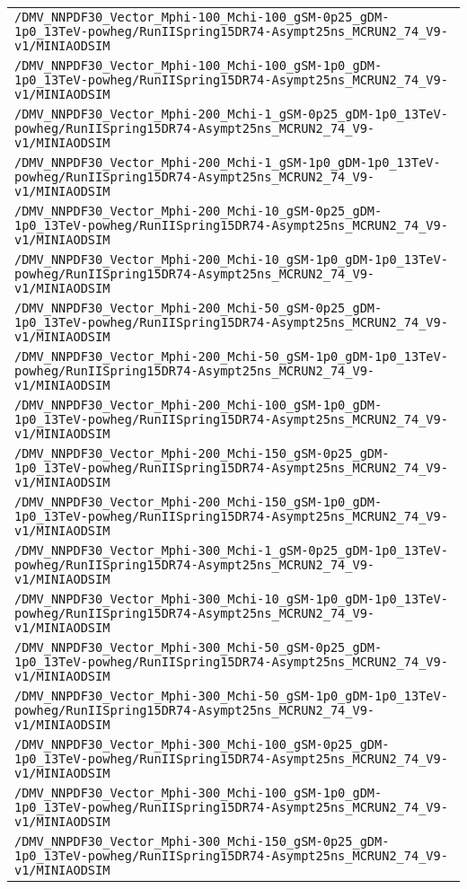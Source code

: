 \begin{center}
\begin{tabular}{l}
\verb!/DMV_NNPDF30_Vector_Mphi-100_Mchi-100_gSM-0p25_gDM-1p0_13TeV-powheg/RunIISpring15DR74-Asympt25ns_MCRUN2_74_V9-v1/MINIAODSIM! \tabularnewline
\verb!/DMV_NNPDF30_Vector_Mphi-100_Mchi-100_gSM-1p0_gDM-1p0_13TeV-powheg/RunIISpring15DR74-Asympt25ns_MCRUN2_74_V9-v1/MINIAODSIM! \tabularnewline
\verb!/DMV_NNPDF30_Vector_Mphi-200_Mchi-1_gSM-0p25_gDM-1p0_13TeV-powheg/RunIISpring15DR74-Asympt25ns_MCRUN2_74_V9-v1/MINIAODSIM! \tabularnewline
\verb!/DMV_NNPDF30_Vector_Mphi-200_Mchi-1_gSM-1p0_gDM-1p0_13TeV-powheg/RunIISpring15DR74-Asympt25ns_MCRUN2_74_V9-v1/MINIAODSIM! \tabularnewline
\verb!/DMV_NNPDF30_Vector_Mphi-200_Mchi-10_gSM-0p25_gDM-1p0_13TeV-powheg/RunIISpring15DR74-Asympt25ns_MCRUN2_74_V9-v1/MINIAODSIM! \tabularnewline
\verb!/DMV_NNPDF30_Vector_Mphi-200_Mchi-10_gSM-1p0_gDM-1p0_13TeV-powheg/RunIISpring15DR74-Asympt25ns_MCRUN2_74_V9-v1/MINIAODSIM! \tabularnewline
\verb!/DMV_NNPDF30_Vector_Mphi-200_Mchi-50_gSM-0p25_gDM-1p0_13TeV-powheg/RunIISpring15DR74-Asympt25ns_MCRUN2_74_V9-v1/MINIAODSIM! \tabularnewline
\verb!/DMV_NNPDF30_Vector_Mphi-200_Mchi-50_gSM-1p0_gDM-1p0_13TeV-powheg/RunIISpring15DR74-Asympt25ns_MCRUN2_74_V9-v1/MINIAODSIM! \tabularnewline
\verb!/DMV_NNPDF30_Vector_Mphi-200_Mchi-100_gSM-1p0_gDM-1p0_13TeV-powheg/RunIISpring15DR74-Asympt25ns_MCRUN2_74_V9-v1/MINIAODSIM! \tabularnewline
\verb!/DMV_NNPDF30_Vector_Mphi-200_Mchi-150_gSM-0p25_gDM-1p0_13TeV-powheg/RunIISpring15DR74-Asympt25ns_MCRUN2_74_V9-v1/MINIAODSIM! \tabularnewline
\verb!/DMV_NNPDF30_Vector_Mphi-200_Mchi-150_gSM-1p0_gDM-1p0_13TeV-powheg/RunIISpring15DR74-Asympt25ns_MCRUN2_74_V9-v1/MINIAODSIM! \tabularnewline
\verb!/DMV_NNPDF30_Vector_Mphi-300_Mchi-1_gSM-0p25_gDM-1p0_13TeV-powheg/RunIISpring15DR74-Asympt25ns_MCRUN2_74_V9-v1/MINIAODSIM! \tabularnewline
\verb!/DMV_NNPDF30_Vector_Mphi-300_Mchi-10_gSM-1p0_gDM-1p0_13TeV-powheg/RunIISpring15DR74-Asympt25ns_MCRUN2_74_V9-v1/MINIAODSIM! \tabularnewline
\verb!/DMV_NNPDF30_Vector_Mphi-300_Mchi-50_gSM-0p25_gDM-1p0_13TeV-powheg/RunIISpring15DR74-Asympt25ns_MCRUN2_74_V9-v1/MINIAODSIM! \tabularnewline
\verb!/DMV_NNPDF30_Vector_Mphi-300_Mchi-50_gSM-1p0_gDM-1p0_13TeV-powheg/RunIISpring15DR74-Asympt25ns_MCRUN2_74_V9-v1/MINIAODSIM! \tabularnewline
\verb!/DMV_NNPDF30_Vector_Mphi-300_Mchi-100_gSM-0p25_gDM-1p0_13TeV-powheg/RunIISpring15DR74-Asympt25ns_MCRUN2_74_V9-v1/MINIAODSIM! \tabularnewline
\verb!/DMV_NNPDF30_Vector_Mphi-300_Mchi-100_gSM-1p0_gDM-1p0_13TeV-powheg/RunIISpring15DR74-Asympt25ns_MCRUN2_74_V9-v1/MINIAODSIM! \tabularnewline
\verb!/DMV_NNPDF30_Vector_Mphi-300_Mchi-150_gSM-0p25_gDM-1p0_13TeV-powheg/RunIISpring15DR74-Asympt25ns_MCRUN2_74_V9-v1/MINIAODSIM! \tabularnewline

\end{tabular}
\end{center}
